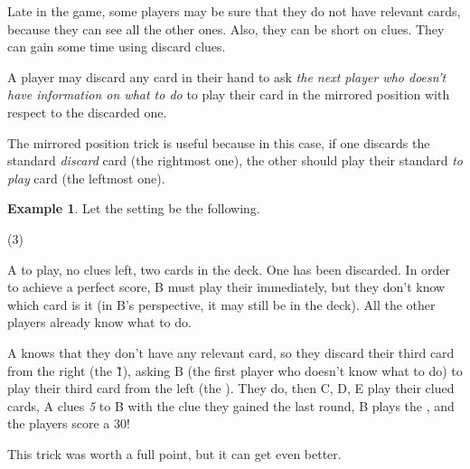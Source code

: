\documentclass[a4paper]{article}
\theoremstyle{plain}
\theoremstyle{definition}
\newtheorem{example}[theorem]{Example}
\begin{document}
Late in the game, some players may be sure that they do not have relevant cards, because they can see all the other ones. Also, they can be short on clues. They can gain some time using discard clues.

A player may discard any card in their hand to ask \textit{the next player who doesn't have information on what to do} to play their card in the mirrored position with respect to the discarded one.

The mirrored position trick is useful because in this case, if one discards the standard \textit{discard} card (the rightmost one), the other should play their standard \textit{to play} card (the leftmost one).

\begin{example}
	
	Let the setting be the following.
	
	\begin{tasks}(3)
		\task[+]      
		\task[A]    
		\task[B]    
		\task[C]    
		\task[D]    
		\task[E]    
	\end{tasks}
	
	A to play, no clues left, two cards in the deck. One  has been discarded. In order to achieve a perfect score, B must play their  immediately, but they don't know which card is it (in B's perspective, it may still be in the deck). All the other players already know what to do.
	
	A knows that they don't have any relevant card, so they discard their third card from the right (the \G{1}), asking B (the first player who doesn't know what to do) to play their third card from the left (the ). They do, then C, D, E play their clued cards, A clues \textit{5} to B with the clue they gained the last round, B plays the , and the players score a 30!
\end{example}

This trick was worth a full point, but it can get even better. 
\end{document}

